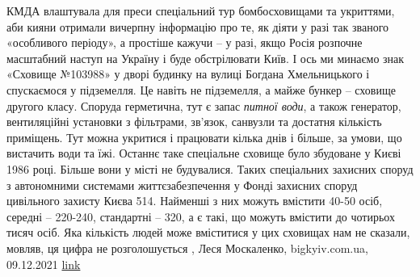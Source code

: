 КМДА влаштувала для преси  спеціальний тур бомбосховищами та укриттями, аби
кияни отримали вичерпну інформацію про те, як діяти у разі так званого
«особливого періоду», а простіше кажучи – у разі, якщо Росія розпочне
масштабний наступ на Україну і буде обстрілювати Київ.  І ось ми минаємо знак
«Сховище №103988» у дворі будинку на вулиці Богдана Хмельницького і спускаємося
у підземелля.  Це навіть не підземелля, а майже бункер – сховище другого класу.
Споруда герметична, тут є запас \emph{питної води}, а також генератор,
вентиляційні установки з фільтрами, зв’язок, санвузли та достатня кількість
приміщень. Тут можна укритися і працювати кілька днів і більше, за умови, що
вистачить води та їжі.  Останнє таке спеціальне сховище було збудоване у Києві
1986 році. Більше вони у місті  не будувалися. Таких спеціальних захисних
споруд з автономними системами життєзабезпечення у Фонді захисних споруд
цивільного захисту Києва 514.  Найменші з них можуть вмістити 40-50 осіб,
середні – 220-240, стандартні – 320, а є такі, що можуть вмістити до чотирьох
тисяч осіб. Яка кількість людей може вміститися у цих сховищах нам не сказали,
мовляв, ця цифра не розголошується
, 
Леся Москаленко, bigkyiv.com.ua, 09.12.2021
\href{https://bigkyiv.com.ua/20-hvylyn-shhob-shovatysya-yaki-shovyshha-ta-ukryttya-gotovi-pryjmaty-kyyan-u-razi-povitryanoyi-ataky}{link}
